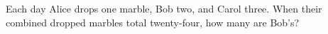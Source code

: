 Each day Alice drops one marble, Bob two, and Carol three. When their combined dropped marbles total twenty-four, how many are Bob's?
